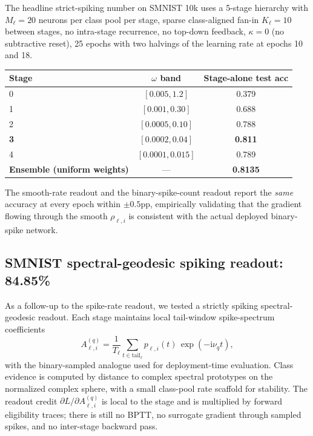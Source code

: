\documentclass[11pt]{article}
\begin{document}
The headline strict-spiking number on SMNIST 10k uses a 5-stage
hierarchy with $M_\ell = 20$ neurons per class pool per stage,
sparse class-aligned fan-in $K_\ell = 10$ between stages, no
intra-stage recurrence, no top-down feedback, $\kappa = 0$ (no
subtractive reset), 25 epochs with two halvings of the learning rate
at epochs 10 and 18.

\begin{center}
\captionsetup{type=table}
\begin{tabular}{@{}lcc@{}}
\toprule
Stage & $\omega$ band & Stage-alone test acc \\
\midrule
0 & $[0.005, 1.2]$    & 0.379 \\
1 & $[0.001, 0.30]$   & 0.688 \\
2 & $[0.0005, 0.10]$  & 0.788 \\
\textbf{3} & $\bm{[0.0002, 0.04]}$  & \textbf{0.811} \\
4 & $[0.0001, 0.015]$ & 0.789 \\
\midrule
\textbf{Ensemble (uniform weights)} & --- & \textbf{0.8135} \\
\bottomrule
\end{tabular}
\end{center}

The smooth-rate readout and the binary-spike-count readout report
the \emph{same} accuracy at every epoch within $\pm 0.5$pp,
empirically validating that the gradient flowing through the smooth
$\rho_{\ell,i}$ is consistent with the actual deployed binary-spike
network.

\subsection{SMNIST spectral-geodesic spiking readout: 84.85\%}

As a follow-up to the spike-rate readout, we tested a strictly
spiking spectral-geodesic readout.  Each stage maintains local
tail-window spike-spectrum coefficients
\[
A_{\ell,i}^{(q)} =
  \frac{1}{T_\ell}\sum_{t \in \mathrm{tail}_\ell}
  p_{\ell,i}(t)\,\exp(-\mathrm{i}\nu_q t),
\]
with the binary-sampled analogue used for deployment-time evaluation.
Class evidence is computed by distance to complex spectral prototypes
on the normalized complex sphere, with a small class-pool rate scaffold
for stability.  The readout credit $\partial L/\partial A_{\ell,i}^{(q)}$
is local to the stage and is multiplied by forward eligibility traces;
there is still no BPTT, no surrogate gradient through sampled spikes,
and no inter-stage backward pass.
\end{document}

